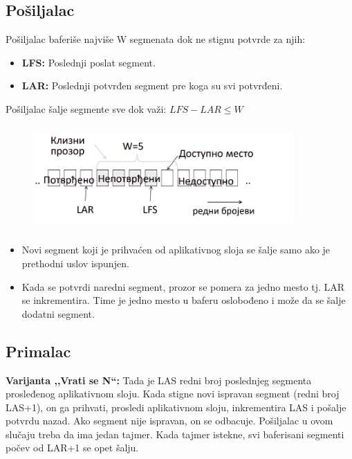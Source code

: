 \documentclass[a4paper]{article}
\begin{document}
    \subsection{Pošiljalac}
        \noindent Pošiljalac baferiše najviše W segmenata dok ne stignu potvrde za njih:
        \begin{itemize}
            \item \textbf{LFS:} Poslednji poslat segment.
            \item \textbf{LAR:} Poslednji potvrđen segment pre koga su svi potvrđeni.
        \end{itemize}
        Pošiljalac šalje segmente sve dok važi: $LFS - LAR \leq W$
        \begin{figure}[H]
            \begin{center}
                \includegraphics[width=100mm,height=40mm]{Slike/tps_klizni_prozori.png}
            \end{center}
        \end{figure}
        \begin{itemize}
            \item Novi segment koji je prihvaćen od aplikativnog sloja se šalje samo ako
                  je prethodni uslov ispunjen. 
            \item Kada se potvrdi naredni segment, prozor se pomera za jedno mesto tj. LAR se
                  inkrementira. Time je jedno mesto u baferu oslobođeno i može da se šalje
                  dodatni segment. 
        \end{itemize}

    \subsection{Primalac}
        \textbf{Varijanta ,,Vrati se N``:} Tada je LAS redni broj poslednjeg segmenta prosleđenog
        aplikativnom sloju. Kada stigne novi ispravan segment (redni broj LAS+1), on ga prihvati, 
        prosledi aplikativnom sloju, inkrementira LAS i pošalje potvrdu nazad. Ako segment nije
        ispravan, on se odbacuje. Pošiljalac u ovom slučaju treba da ima jedan tajmer.
        Kada tajmer istekne, svi baferisani segmenti počev od LAR+1 se opet šalju. \\
\end{document}
